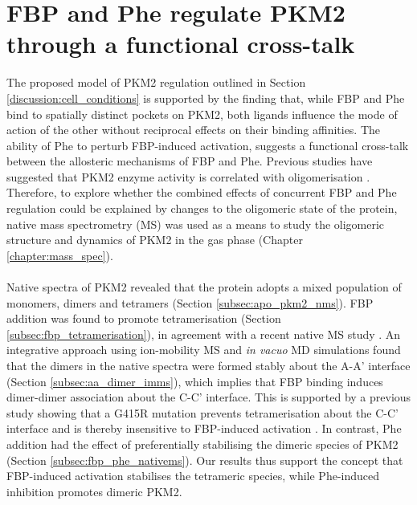 \section{FBP and Phe regulate PKM2 through a functional cross-talk}
The proposed model of PKM2 regulation outlined in Section \ref{discussion:cell_conditions} is supported by the finding that, while FBP and Phe bind to spatially distinct pockets on PKM2, both ligands influence the mode of action of the other without reciprocal effects on their binding affinities. The ability of Phe to perturb FBP-induced activation, suggests a functional cross-talk between the allosteric mechanisms of FBP and Phe. Previous studies have suggested that PKM2 enzyme activity is correlated with oligomerisation \cite{Hofmann:1975aa,Anastasiou:2012aa,Morgan:2013aa,Yuan:2018aa,Gavriilidou:2018aa,Feliu:1976aa,Eigenbrodt:1983aa,Ikeda:1998aa}. Therefore, to explore whether the combined effects of concurrent FBP and Phe regulation could be explained by changes to the oligomeric state of the protein, native mass spectrometry (MS) was used as a means to study the oligomeric structure and dynamics of PKM2 in the gas phase (Chapter \ref{chapter:mass_spec}).
%
%
\\\\
%
%
Native spectra of PKM2 revealed that the protein adopts a mixed population of monomers, dimers and tetramers (Section \ref{subsec:apo_pkm2_nms}). FBP addition was found to promote tetramerisation (Section \ref{subsec:fbp_tetramerisation}), in agreement with a recent native MS study \cite{Gavriilidou:2018aa}. An integrative approach using ion-mobility MS and \textit{in vacuo} MD simulations found that the dimers in the native spectra were formed stably about the A-A' interface (Section \ref{subsec:aa_dimer_imms}), which implies that FBP binding induces dimer-dimer association about the C-C' interface. This is supported by a previous study showing that a G415R mutation prevents tetramerisation about the C-C' interface and is thereby insensitive to FBP-induced activation \cite{Yan:2016aa}. In contrast, Phe addition had the effect of preferentially stabilising the dimeric species of PKM2 (Section \ref{subsec:fbp_phe_nativems}). Our results thus support the concept that FBP-induced activation stabilises the tetrameric species, while Phe-induced inhibition promotes dimeric PKM2.
%
%
\\\\
%
%
